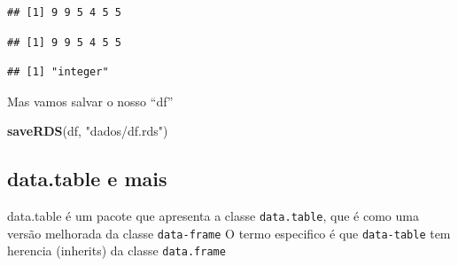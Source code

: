 \documentclass[]{book}
\newenvironment{Shaded}{\begin{snugshade}}{\end{snugshade}}
\newcommand{\KeywordTok}[1]{\textcolor[rgb]{0.13,0.29,0.53}{\textbf{#1}}}
\newcommand{\DecValTok}[1]{\textcolor[rgb]{0.00,0.00,0.81}{#1}}
\newcommand{\StringTok}[1]{\textcolor[rgb]{0.31,0.60,0.02}{#1}}
\newcommand{\OperatorTok}[1]{\textcolor[rgb]{0.81,0.36,0.00}{\textbf{#1}}}
\newcommand{\NormalTok}[1]{#1}
\theoremstyle{definition}
\theoremstyle{definition}
\theoremstyle{definition}
\theoremstyle{remark}
\begin{document}
\begin{Shaded}
\end{Shaded}

\begin{verbatim}
## [1] 9 9 5 4 5 5
\end{verbatim}

\begin{Shaded}
\end{Shaded}

\begin{verbatim}
## [1] 9 9 5 4 5 5
\end{verbatim}

\begin{Shaded}
\end{Shaded}

\begin{verbatim}
## [1] "integer"
\end{verbatim}

Mas vamos salvar o nosso ``df''

\begin{Shaded}
\begin{Highlighting}[]
\KeywordTok{saveRDS}\NormalTok{(df, }\StringTok{"dados/df.rds"}\NormalTok{)}
\end{Highlighting}
\end{Shaded}

\subsection{data.table e mais}\label{data.table-e-mais}

data.table é um pacote que apresenta a classe \texttt{data.table}, que é
como uma versão melhorada da classe \texttt{data-frame} O termo
especifico é que \texttt{data-table} tem herencia (inherits) da classe
\texttt{data.frame}
\end{document}

